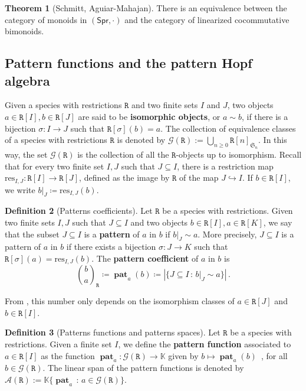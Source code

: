 \documentclass[submission]{FPSAC2023}
\theoremstyle{definition}
\newtheorem{thm}{Theorem}[section]
\newtheorem{defin}[thm]{Definition}
\DeclareMathOperator{\pat}{\mathbf{pat}}
\newcommand{\Spr}{\mathsf{Spr}} %
\newcommand{\prR}{\mathtt{R}}
\newcommand{\Kc}{\mathcal{K}}
\newcommand{\Kcb}{\overline{\Kc}}
\begin{document}
\begin{thm}[Schmitt, Aguiar-Mahajan]\label{thm:swr_lcc}
There is an equivalence between the category of monoids in $(\Spr, \cdot)$ and the category of linearized cocommutative bimonoids.
\end{thm}

\subsection{Pattern functions and the pattern Hopf algebra}

Given a species with restrictions $\prR$ and two finite sets $I$ and $J$, two objects $a\in \prR[I], b\in \prR[J]$ are said to be {\bf isomorphic objects}, or $a\sim b$, if there is a bijection $\sigma:I\to J$ such that $\prR[\sigma](b)=a$. The collection of equivalence classes of a species with restrictions $\prR$ is denoted by $\mathcal{G}(\prR) := \bigcup_{n\geq 0 } \prR[n]_{\mathfrak{S}_n}$. 
In this way, the set $\mathcal G(\prR) $ is the collection of all the $\prR$-objects up to isomorphism. 
Recall that for every two finite set $I,J$ such that $J \subseteq I$, there is a restriction map $\text{res}_{I,J}: \prR[I] \to \prR[J]$, defined as the image by $\prR$ of the map $J \hookrightarrow I$. If $b \in \prR[I]$, we write $b|_J \coloneqq\text{res}_{I,J}(b)$.

\begin{defin}[Patterns coefficients]\label{defin:patterncoeff}
Let $\prR$ be a species with restrictions. Given two finite sets $I,J$ such that $J \subseteq I$ and two objects $b\in \prR[I], a\in \prR[K]$,
we say that the subset $J \subseteq I$ is a {\bf pattern} of $a$ in $b$ if $b|_J \sim a$. More precisely, $J \subseteq I$ is a pattern of $a$ in $b$ if there exists a bijection $\sigma: J \to K$ such that $\prR[\sigma](a)=\text{res}_{I,J}(b)$. The {\bf pattern coefficient} of $a$ in $b$ is
\begin{equation}
    \binom{b}{a}_{\!\prR} \coloneqq \pat_a(b) \coloneqq \left| \{J \subseteq I \, : \, b|_J \sim a \} \right| \, .
\end{equation}
\end{defin}

From \cite{Penaguiao2020}, this number only depends on the isomorphism classes of $a \in \prR[J]$ and $b \in \prR[I]$.

\begin{defin}[Patterns functions and patterns spaces]\label{defin:pattern}
Let $\prR$ be a species with restrictions. Given a finite set $I$, we define the {\bf pattern function} associated to $a \in \prR[I]$ as the function $\pat_a: \mathcal{G}(\prR) \to \mathbb{K}$
given by $\displaystyle b \mapsto \pat_a(b)$\, ,
for all $b \in \mathcal{G}(\prR)$. The linear span of the pattern functions is denoted by $\mathcal{A}(\prR):=\mathbb{K}\{\pat_a \, : \, a\in \mathcal{G}(\prR)\}$.
\end{defin}
\end{document}

